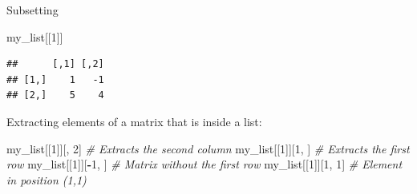 \documentclass[ignorenonframetext,]{beamer}
\newenvironment{Shaded}{\begin{snugshade}}{\end{snugshade}}
\newcommand{\CommentTok}[1]{\textcolor[rgb]{0.56,0.35,0.01}{\textit{#1}}}
\newcommand{\DecValTok}[1]{\textcolor[rgb]{0.00,0.00,0.81}{#1}}
\newcommand{\NormalTok}[1]{#1}
\newcommand{\OperatorTok}[1]{\textcolor[rgb]{0.81,0.36,0.00}{\textbf{#1}}}
\begin{document}
\begin{frame}[fragile]{Subsetting}
\protect\hypertarget{subsetting-9}{}

\begin{Shaded}
\begin{Highlighting}[]
\NormalTok{my_list[[}\DecValTok{1}\NormalTok{]]}
\end{Highlighting}
\end{Shaded}

\begin{verbatim}
##      [,1] [,2]
## [1,]    1   -1
## [2,]    5    4
\end{verbatim}

Extracting elements of a matrix that is inside a list:

\begin{Shaded}
\begin{Highlighting}[]
\NormalTok{my_list[[}\DecValTok{1}\NormalTok{]][, }\DecValTok{2}\NormalTok{] }\CommentTok{# Extracts the second column}
\NormalTok{my_list[[}\DecValTok{1}\NormalTok{]][}\DecValTok{1}\NormalTok{, ] }\CommentTok{# Extracts the first row}
\NormalTok{my_list[[}\DecValTok{1}\NormalTok{]][}\OperatorTok{-}\DecValTok{1}\NormalTok{, ] }\CommentTok{# Matrix without the first row}
\NormalTok{my_list[[}\DecValTok{1}\NormalTok{]][}\DecValTok{1}\NormalTok{, }\DecValTok{1}\NormalTok{] }\CommentTok{# Element in position (1,1)}
\end{Highlighting}
\end{Shaded}

\end{frame}
\end{document}
